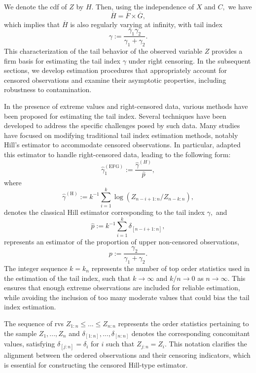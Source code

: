 \documentclass[reqno,openbib,runningheads,a4paper,12pt]{amsart}%
\begin{document}
\noindent We denote the cdf of $Z$ by $H.$ Then, using the independence of $X$
and $C,$ we have
\[
\overline{H}=\overline{F}\times\overline{G},
\]
which implies that $\overline{H}$ is also regularly varying at infinity, with
tail index
\[
\gamma:=\frac{\gamma_{1}\gamma_{2}}{\gamma_{1}+\gamma_{2}}.
\]
This characterization of the tail behavior of the observed variable $Z$
provides a firm basis for estimating the tail index $\gamma$ under right
censoring. In the subsequent sections, we develop estimation procedures that
appropriately account for censored observations and examine their asymptotic
properties, including robustness to contamination.\medskip

\noindent In the presence of extreme values and right-censored data, various
methods have been proposed for estimating the tail index. Several techniques
have been developed to address the specific challenges posed by such data.
Many studies have focused on modifying traditional tail index estimation
methods, notably Hill's estimator \citep[][]{Hill75} to accommodate censored
observations. In particular, \cite{EnFG08} adapted this estimator to handle
right-censored data, leading to the following form:
\[
\widehat{\gamma}_{1}^{\left(  \mathrm{EFG}\right)  }:=\frac{\widehat{\gamma
}^{\left(  H\right)  }}{\widehat{p}},
\]
where%
\[
\widehat{\gamma}^{\left(  \mathrm{H}\right)  }:=k^{-1}%
{\displaystyle\sum\limits_{i=1}^{k}}
\log\left(  Z_{n-i+1:n}/Z_{n-k:n}\right)  ,
\]
denotes the classical Hill estimator corresponding to the tail index $\gamma,$
and
\[
\widehat{p}:=k^{-1}%
{\displaystyle\sum_{i=1}^{k}}
\delta_{\left[  n-i+1:n\right]  },
\]
represents an estimator of the proportion of upper non-censored observations,
\begin{equation}
p:=\frac{\gamma_{2}}{\gamma_{1}+\gamma_{2}}.\label{p}%
\end{equation}
The integer sequence $k=k_{n}$ represents the number of top order statistics
used in the estimation of the tail index, such that $k\rightarrow\infty$ and
$k/n\rightarrow0$ as $n\rightarrow\infty.$ This ensures that enough extreme
observations are included for reliable estimation, while avoiding the
inclusion of too many moderate values that could bias the tail index
estimation.\smallskip

\noindent The sequence of rvs $Z_{1:n}\leq...\leq Z_{n:n}$ represents the
order statistics pertaining to the sample $Z_{1},...,Z_{n}$ and $\delta
_{\left[  1:n\right]  },...,\delta_{\left[  n:n\right]  }$ denotes the
corresponding concomitant values, satisfying $\delta_{\left[  j:n\right]
}=\delta_{i}$ for $i$ such that $Z_{j:n}=Z_{i}.$ This notation clarifies the
alignment between the ordered observations and their censoring indicators,
which is essential for constructing the censored Hill-type
estimator.\smallskip
\end{document}
